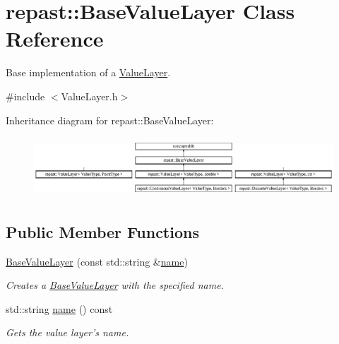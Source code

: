 \hypertarget{classrepast_1_1_base_value_layer}{\section{repast\-:\-:Base\-Value\-Layer Class Reference}
\label{classrepast_1_1_base_value_layer}
}


Base implementation of a \hyperlink{classrepast_1_1_value_layer}{Value\-Layer}.  




{\ttfamily \#include $<$Value\-Layer.\-h$>$}

Inheritance diagram for repast\-:\-:Base\-Value\-Layer\-:\begin{figure}[H]
\begin{center}
\leavevmode
\includegraphics[height=2.269504cm]{classrepast_1_1_base_value_layer}
\end{center}
\end{figure}
\subsection*{Public Member Functions}
\begin{DoxyCompactItemize}
\item 
\hypertarget{classrepast_1_1_base_value_layer_a7b3e7be23a249233d40b2a72fa24e09f}{\hyperlink{classrepast_1_1_base_value_layer_a7b3e7be23a249233d40b2a72fa24e09f}{Base\-Value\-Layer} (const std\-::string \&\hyperlink{classrepast_1_1_base_value_layer_a27277765ee50f9d5446b253f77797f5c}{name})}\label{classrepast_1_1_base_value_layer_a7b3e7be23a249233d40b2a72fa24e09f}

\begin{DoxyCompactList}\small\item\em Creates a \hyperlink{classrepast_1_1_base_value_layer}{Base\-Value\-Layer} with the specified name. \end{DoxyCompactList}\item 
std\-::string \hyperlink{classrepast_1_1_base_value_layer_a27277765ee50f9d5446b253f77797f5c}{name} () const 
\begin{DoxyCompactList}\small\item\em Gets the value layer's name. \end{DoxyCompactList}\end{DoxyCompactItemize}
